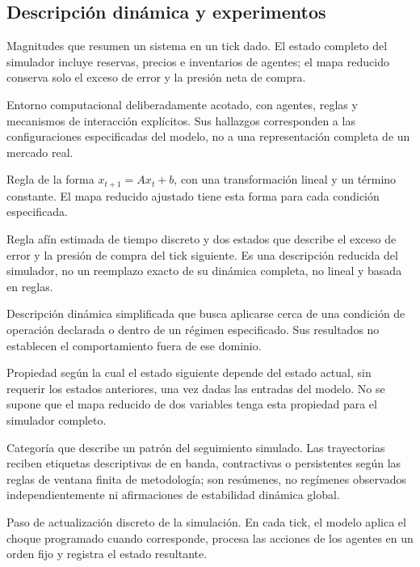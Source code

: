 \subsection*{Descripción dinámica y experimentos}
\begin{description}[style=unboxed,leftmargin=0pt,labelwidth=0pt,labelsep=0.5em,itemsep=0.1em]
  \item[Estado:] Magnitudes que resumen un sistema en un tick dado. El estado completo del simulador incluye reservas, precios e inventarios de agentes; el mapa reducido conserva solo el exceso de error y la presión neta de compra.
  \item[Micromundo:] Entorno computacional deliberadamente acotado, con agentes, reglas y mecanismos de interacción explícitos. Sus hallazgos corresponden a las configuraciones especificadas del modelo, no a una representación completa de un mercado real.
  \item[Mapa afín:] Regla de la forma $x_{t+1}=Ax_t+b$, con una transformación lineal y un término constante. El mapa reducido ajustado tiene esta forma para cada condición especificada.
  \item[Mapa reducido:] Regla afín estimada de tiempo discreto y dos estados que describe el exceso de error y la presión de compra del tick siguiente. Es una descripción reducida del simulador, no un reemplazo exacto de su dinámica completa, no lineal y basada en reglas.
  \item[Modelo local / linealización:] Descripción dinámica simplificada que busca aplicarse cerca de una condición de operación declarada o dentro de un régimen especificado. Sus resultados no establecen el comportamiento fuera de ese dominio.
  \item[Propiedad de Markov:] Propiedad según la cual el estado siguiente depende del estado actual, sin requerir los estados anteriores, una vez dadas las entradas del modelo. No se supone que el mapa reducido de dos variables tenga esta propiedad para el simulador completo.
  \item[Régimen:] Categoría que describe un patrón del seguimiento simulado. Las trayectorias reciben etiquetas descriptivas de en banda, contractivas o persistentes según las reglas de ventana finita de metodología; son resúmenes, no regímenes observados independientemente ni afirmaciones de estabilidad dinámica global.
  \item[Tick:] Paso de actualización discreto de la simulación. En cada tick, el modelo aplica el choque programado cuando corresponde, procesa las acciones de los agentes en un orden fijo y registra el estado resultante.

\end{description}
